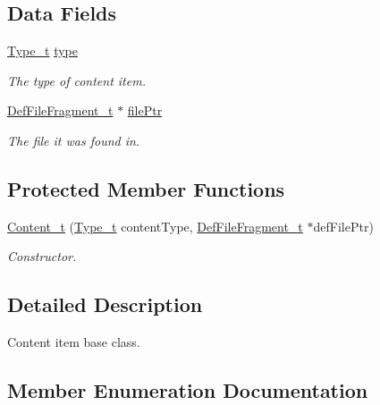 \subsection*{Data Fields}
\begin{DoxyCompactItemize}
\item 
\hyperlink{structparse_tree_1_1_content__t_a45cc4a193beac87a2045a2f6b6870d1b}{Type\+\_\+t} \hyperlink{structparse_tree_1_1_content__t_a0f34791b6c4a7ffa174e222bdb73d9ff}{type}
\begin{DoxyCompactList}\small\item\em The type of content item. \end{DoxyCompactList}\item 
\hyperlink{structparse_tree_1_1_def_file_fragment__t}{Def\+File\+Fragment\+\_\+t} $\ast$ \hyperlink{structparse_tree_1_1_content__t_ab4ff9fb25cc6b515bef43f21aec6fba0}{file\+Ptr}
\begin{DoxyCompactList}\small\item\em The file it was found in. \end{DoxyCompactList}\end{DoxyCompactItemize}
\subsection*{Protected Member Functions}
\begin{DoxyCompactItemize}
\item 
\hyperlink{structparse_tree_1_1_content__t_adfc515d7061033a77fda14a2fd58de95}{Content\+\_\+t} (\hyperlink{structparse_tree_1_1_content__t_a45cc4a193beac87a2045a2f6b6870d1b}{Type\+\_\+t} content\+Type, \hyperlink{structparse_tree_1_1_def_file_fragment__t}{Def\+File\+Fragment\+\_\+t} $\ast$def\+File\+Ptr)
\begin{DoxyCompactList}\small\item\em Constructor. \end{DoxyCompactList}\end{DoxyCompactItemize}


\subsection{Detailed Description}
Content item base class. 

\subsection{Member Enumeration Documentation}
